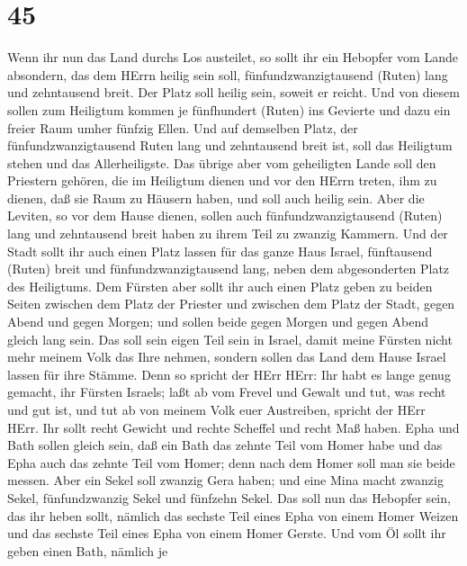\hypertarget{section-44}{%
\section{45}\label{section-44}}

 Wenn ihr nun das Land durchs Los austeilet, so sollt ihr
ein Hebopfer vom Lande absondern, das dem HErrn heilig sein soll,
fünfundzwanzigtausend (Ruten) lang und zehntausend breit. Der Platz soll
heilig sein, soweit er reicht.  Und von diesem sollen zum
Heiligtum kommen je fünfhundert (Ruten) ins Gevierte und dazu ein freier
Raum umher fünfzig Ellen.  Und auf demselben Platz, der
fünfundzwanzigtausend Ruten lang und zehntausend breit ist, soll das
Heiligtum stehen und das Allerheiligste.  Das übrige aber
vom geheiligten Lande soll den Priestern gehören, die im Heiligtum
dienen und vor den HErrn treten, ihm zu dienen, daß sie Raum zu Häusern
haben, und soll auch heilig sein.  Aber die Leviten, so vor
dem Hause dienen, sollen auch fünfundzwanzigtausend (Ruten) lang und
zehntausend breit haben zu ihrem Teil zu zwanzig Kammern. 
Und der Stadt sollt ihr auch einen Platz lassen für das ganze Haus
Israel, fünftausend (Ruten) breit und fünfundzwanzigtausend lang, neben
dem abgesonderten Platz des Heiligtums.  Dem Fürsten aber
sollt ihr auch einen Platz geben zu beiden Seiten zwischen dem Platz der
Priester und zwischen dem Platz der Stadt, gegen Abend und gegen Morgen;
und sollen beide gegen Morgen und gegen Abend gleich lang sein.
 Das soll sein eigen Teil sein in Israel, damit meine
Fürsten nicht mehr meinem Volk das Ihre nehmen, sondern sollen das Land
dem Hause Israel lassen für ihre Stämme.  Denn so spricht
der HErr HErr: Ihr habt es lange genug gemacht, ihr Fürsten Israels;
laßt ab vom Frevel und Gewalt und tut, was recht und gut ist, und tut ab
von meinem Volk euer Austreiben, spricht der HErr HErr. 
Ihr sollt recht Gewicht und rechte Scheffel und recht Maß haben.
 Epha und Bath sollen gleich sein, daß ein Bath das zehnte
Teil vom Homer habe und das Epha auch das zehnte Teil vom Homer; denn
nach dem Homer soll man sie beide messen.  Aber ein Sekel
soll zwanzig Gera haben; und eine Mina macht zwanzig Sekel,
fünfundzwanzig Sekel und fünfzehn Sekel.  Das soll nun das
Hebopfer sein, das ihr heben sollt, nämlich das sechste Teil eines Epha
von einem Homer Weizen und das sechste Teil eines Epha von einem Homer
Gerste.  Und vom Öl sollt ihr geben einen Bath, nämlich je
